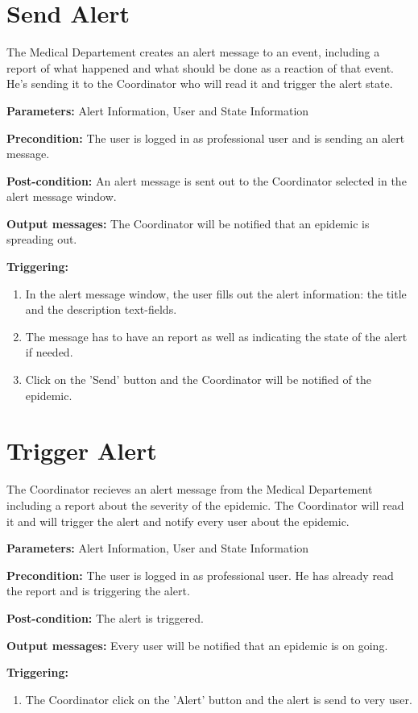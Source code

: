 \section{Send Alert}
\label{operation:Send Alert}
The Medical Departement creates an alert message to an event, including a
report of what happened and what should be done as a reaction of that event.
He's sending it to the Coordinator who will read it and trigger the alert state.\\
\begin{description}
\item \textbf{Parameters:} Alert Information, User and State Information
\item \textbf{Precondition:} The user is logged in as professional user and is
sending an alert message.
\item \textbf{Post-condition:}  An alert message is sent out to the Coordinator
selected in the alert message window.
\item \textbf{Output messages:} The Coordinator will be notified that an
epidemic is spreading out.
\item \textbf{Triggering:}
\begin{enumerate}
\item In the alert message window, the user fills out the alert information: the title and the description text-fields.
\item The message has to have an report as well as indicating the state of the
alert if needed.
\item Click on the 'Send' button and the Coordinator will be notified of the
epidemic.
\end{enumerate}
\end{description}

\section{Trigger Alert}
\label{operation:TriggerAlert}
The Coordinator recieves an alert message from the Medical Departement
including a report about the severity of the epidemic. The Coordinator will
read it and will trigger the alert and notify every user about the epidemic.\\
\begin{description}
\item \textbf{Parameters:} Alert Information, User and State Information
\item \textbf{Precondition:} The user is logged in as professional user. He
has already read the report and is triggering the alert.
\item \textbf{Post-condition:} The alert is triggered.
\item \textbf{Output messages:} Every user will be notified that an epidemic is
on going.
\item \textbf{Triggering:}
\begin{enumerate}
\item The Coordinator click on the 'Alert' button and the alert is send to very
user.
\end{enumerate}
\end{description}

